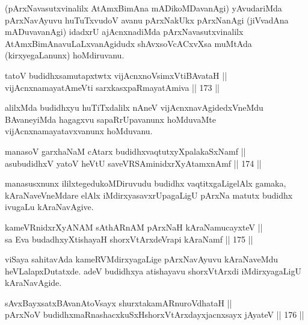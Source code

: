 \begin{artha}
(pArxNavasutxvinalilx AtAmxBimAna mADikoMDavanAgi) yAvudariMda
pArxNavAyuvu huTuTxvudoV avanu pArxNakUkx pArxNanAgi (jiVvadAna
mADuvavanAgi) idadxrU ajAcnxnadiMda pArxNavasutxvinalilx
AtAmxBimAnavuLaLxvanAgidudx shAvxsoVcACxvXsa muMtAda
(kirxyegaLanunx) hoMdiruvanu.
\end{artha}


\begin{shl}
tatoV budidhxsamutapxtwtx vijAcnxnoV\s simxVtiBAvataH || \\
vijAcnxnamayatAmeVti sarxkasxpaRmayatAmiva \hfill || 173 ||  
\end{shl}

\begin{artha}
alilxMda budidhxyu huTiTxdalilx nAneV vijAcnxnavAgidedxVneMdu
BAvaneyiMda hagagxvu sapaRrUpavanunx hoMduvaMte
vijAcnxnamayatavxvanunx hoMduvanu.
\end{artha}

\begin{shl}
manasoV garxhaNaM cAtarx budidhxvaqtutxyXpalakaSxNamf || \\
asubudidhxV yatoV heVtU saveVRSAminidxrXyAtamxnAmf \hfill || 174 ||  
\end{shl}

\begin{artha}
manasusxnunx ililxtegedukoMDiruvudu budidhx vaqtitxgaLigelAlx gamaka,
kAraNaveVneMdare elAlx iMdirxyasavxrUpagaLigU pArxNa matutx budidhx
ivugaLu kAraNavAgive.
\end{artha}

\begin{shl}
kameVRnidxrXyANAM sAthARnAM pArxNaH kAraNamucayxteV || \\
sa Eva budadhxyXtishayaH shorxVtArxdeVrapi kAraNamf \hfill || 175 ||  
\end{shl}

\begin{artha}
viSaya sahitavAda kameRVMdirxyagaLige pArxNavAyuvu
kAraNaveMdu heVLalapxDutatxde. adeV budidhxya atishayavu shorxVtArxdi
iMdirxyagaLigU kAraNavAgide.
\end{artha}


\begin{shl}
sAvxBayxsatxBAvanAtoV\s sayx shurxtakamARnuroVdhataH || \\
pArxNoV budidhxmaRnashacxkuSxHshorxVtArxdayxjacnxsayx jAyateV \hfill || 176 || 
\end{shl}

